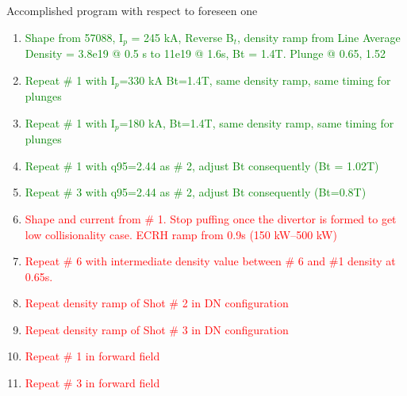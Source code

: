 \documentclass[10pt, compress]{beamer}
\newcommand\Fontvi{\fontsize{8}{7.2}\selectfont}
\begin{document}
\begin{frame}{Accomplished program with respect to foreseen one}
  \Fontvi
\begin{enumerate}
\item \textcolor{green}{Shape from 57088, I$_p$ = 245 kA,  Reverse B$_t$,
    density ramp from Line Average Density = 3.8e19 @ 0.5 s to 11e19 @ 1.6s,  Bt = 1.4T. Plunge @ 0.65, 1.52}
\item  \textcolor{green}{Repeat \# 1 with I$_p$=330 kA Bt=1.4T, same density ramp, same timing for plunges}
\item  \textcolor{green}{Repeat \# 1 with I$_p$=180 kA, Bt=1.4T, same density ramp, same timing for plunges}
\item  \textcolor{green}{Repeat \# 1 with q95=2.44 as \# 2, adjust Bt consequently (Bt = 1.02T)}
\item  \textcolor{green}{Repeat \# 3 with q95=2.44 as \# 2, adjust Bt consequently (Bt=0.8T)}
\item  \textcolor{red}{Shape and current from \# 1. Stop puffing once the divertor is
  formed to get low collisionality case. ECRH ramp from 0.9s (150
  kW--500 kW)}
\item  \textcolor{red}{Repeat \# 6 with intermediate density value between \# 6 and
  \#1 density at 0.65s.} 
\item  \textcolor{red}{Repeat density ramp of Shot \# 2 in DN configuration} 
\item  \textcolor{red}{Repeat density ramp of Shot \# 3 in DN configuration} 
\item \textcolor{red}{Repeat \# 1 in forward field}
\item \textcolor{red}{Repeat \# 3 in forward field}
\end{enumerate}

\end{frame}
\end{document}
